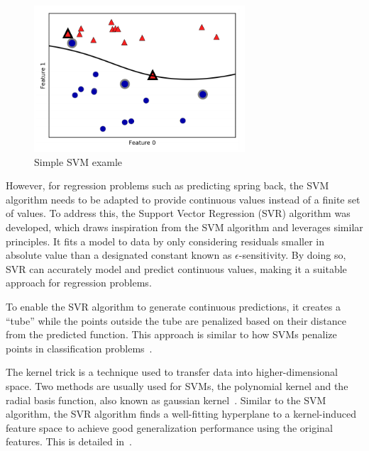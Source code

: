 \begin{figure}[H]
    \begin{tcolorbox}[arc=0pt,boxrule=0.5pt]
        \centering
        \includegraphics[width=0.7\textwidth]{chap4/images/svm_example}
        \caption{Simple \ac{SVM} examle~\cite[p. 94]{muller_introductionmachinelearning_2016}}
        \label{fig:svm-example}
    \end{tcolorbox}
\end{figure}

However, for regression problems such as predicting spring back, the \ac{SVM} algorithm
needs to be adapted to provide continuous values instead of a finite set of values.
To address this, the Support Vector Regression (SVR) algorithm was developed, which draws inspiration from the
\ac{SVM} algorithm and leverages similar principles.
It fits a model to data by only considering residuals smaller in absolute value
than a designated constant known as $\epsilon$-sensitivity.
By doing so, \ac{SVR} can accurately model and predict continuous values, making it a
suitable approach for regression problems.

To enable the \ac{SVR} algorithm to generate continuous predictions, it creates a ``tube''
while the points outside the tube are penalized based on their distance from the
predicted function.
This approach is similar to how \ac{SVM}s penalize points in classification
problems~\cite[p. 369]{montesinoslopez_supportvectormachines_2022}.

The kernel trick is a technique used to transfer data into higher-dimensional space.
Two methods are usually used for \ac{SVM}s, the polynomial kernel and the radial basis
function, also known as gaussian kernel~\cite[p. 97--98]{muller_introductionmachinelearning_2016}.
Similar to the \ac{SVM} algorithm, the \ac{SVR} algorithm finds a well-fitting hyperplane to a
kernel-induced feature space to achieve good generalization performance using the original
features.
This is detailed in~\cite[p. 369]{montesinoslopez_supportvectormachines_2022}.

